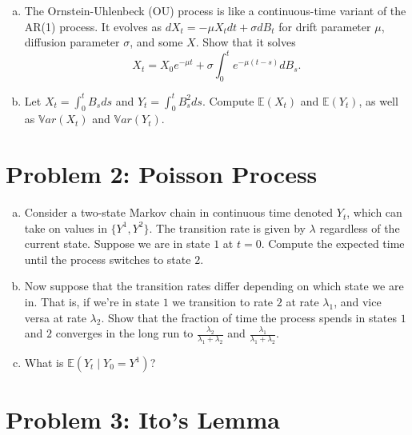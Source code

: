 \documentclass[11pt]{extarticle}
\theoremstyle{plain}
\theoremstyle{definition}
\begin{document}
\begin{enumerate}[(a)]
\item The Ornstein-Uhlenbeck (OU) process is like a continuous-time variant of the AR(1) process. It evolves as $dX_t = - \mu X_t dt + \sigma dB_t$ for drift parameter $\mu$, diffusion parameter $\sigma$, and some $X$. Show that it solves 
\begin{equation*}
	X_t = X_0 e^{- \mu t} + \sigma \int_0^t e^{-\mu(t - s)} dB_s.
\end{equation*}

\item Let $X_t = \int_0^t B_s ds$ and $Y_t = \int_0^t B_s^2 ds$. Compute $\mathbb E(X_t)$ and $\mathbb E(Y_t)$, as well as $\mathbb Var(X_t)$ and $\mathbb Var(Y_t)$. 
\end{enumerate}


\vspace{5mm}
\section*{Problem 2: Poisson Process}

\begin{enumerate}[(a)]
\item Consider a two-state Markov chain in continuous time denoted $Y_t$, which can take on values in $\{Y^1, Y^2\}$. The transition rate is given by $\lambda$ regardless of the current state. Suppose we are in state $1$ at $t = 0$. Compute the expected time until the process switches to state $2$. 

\item Now suppose that the transition rates differ depending on which state we are in. That is, if we're in state $1$ we transition to rate $2$ at rate $\lambda_1$, and vice versa at rate $\lambda_2$. Show that the fraction of time the process spends in states $1$ and $2$ converges in the long run to $\frac{\lambda_2}{\lambda_1 + \lambda_2}$ and $\frac{\lambda_1}{\lambda_1 + \lambda_2}$. 

\item What is $\mathbb E (Y_t \mid Y_0 = Y^1)$?

\end{enumerate}


\vspace{5mm}
\section*{Problem 3: Ito's Lemma}
\end{document}
